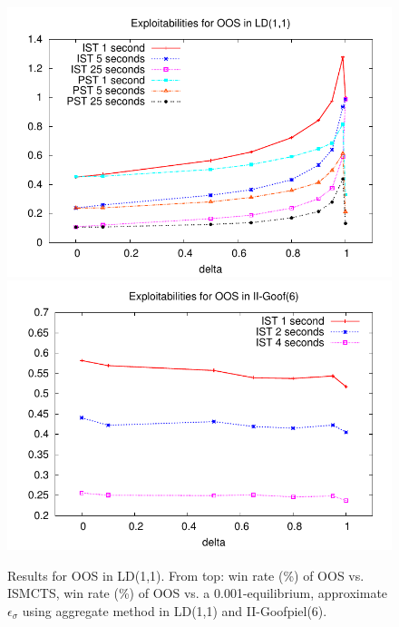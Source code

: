 \documentclass[letterpaper]{article}
\newcounter{mlNoteCounter}
\newcommand{\mlnote}[1]{{\scriptsize \color{darkgreen} $\blacksquare$ \refstepcounter{mlNoteCounter}\textsf{[ML]$_{\arabic{mlNoteCounter}}$:{#1}}}}
\begin{document}
\begin{figure}[t!]
\begin{center}
\includegraphics[scale=0.55]{plots/oos-expl} \\
\includegraphics[scale=0.55]{plots/goof-expl} \\
\caption{Results for OOS in LD(1,1). From top: win rate (\%) of OOS vs. ISMCTS, win rate (\%) of 
OOS vs. a 0.001-equilibrium, approximate $\epsilon_{\sigma}$ using aggregate method in LD(1,1) 
and II-Goofpiel(6).  }
\label{fig:results}
\end{center}
\end{figure}

\end{document}
